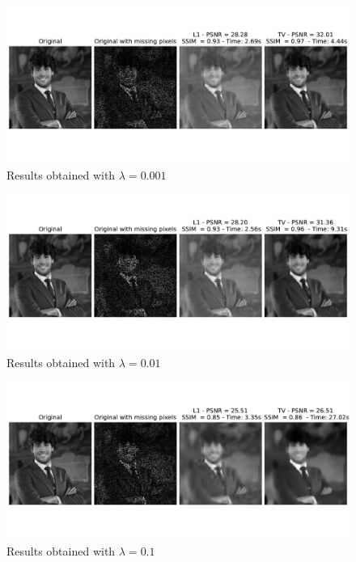 \documentclass[12pt]{article}
\begin{document}
\begin{figure}[H]
    \centering
    \includegraphics[width=17cm]{hw3/codes/exercise2/results/lambda_search/me_0-001.pdf}
    \caption{Results obtained with $\lambda = 0.001$}
    \label{fig:lambda-search-0.001}
\end{figure}

\begin{figure}[H]
    \centering
    \includegraphics[width=17cm]{hw3/codes/exercise2/results/lambda_search/me_0-01.pdf}
    \caption{Results obtained with $\lambda = 0.01$}
    \label{fig:lambda-search-0.01}
\end{figure}

\begin{figure}[H]
    \centering
    \includegraphics[width=17cm]{hw3/codes/exercise2/results/lambda_search/me_0-1.pdf}
    \caption{Results obtained with $\lambda = 0.1$}
    \label{fig:lambda-search-0.1}
\end{figure}
\end{document}

